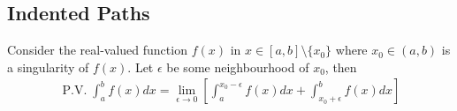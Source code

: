 \documentclass[12pt, english]{book}
\begin{document}
	\subsection{Indented Paths} \label{Indented Paths Subsection - Complex}
	
	\begin{definition}
		\label{Cauchy Principal Value of Integral with Singularity Definition - Complex}
		Consider the real-valued function \(f(x)\) in \(x \in [a, b] \setminus \{x_0\}\) where \(x_0 \in (a, b)\) is a singularity of \(f(x)\). Let \(\epsilon\) be some neighbourhood of \(x_0\), then
		\begin{align*}
			\operatorname{P.V.}\int_{a}^{b} f(x) dx 
			= \lim_{\epsilon \rightarrow 0}\left[
			\int_{a}^{x_0 - \epsilon} f(x) dx + \int_{x_0 + \epsilon}^{b} f(x) dx
			\right]
		\end{align*}
	\end{definition}
	
\end{document}
